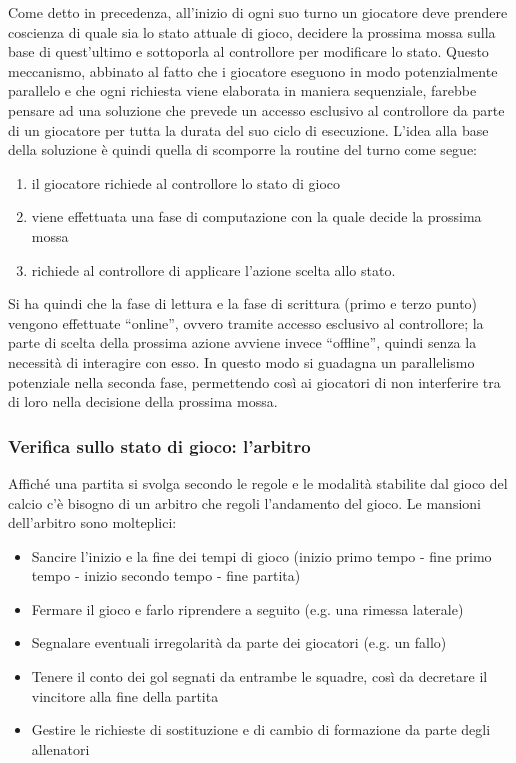 Come detto in precedenza, all'inizio di ogni suo turno un giocatore deve prendere coscienza di quale sia lo stato attuale di gioco, decidere la prossima mossa sulla base di quest'ultimo e sottoporla al controllore per modificare lo stato. Questo meccanismo, abbinato al fatto che i giocatore eseguono in modo potenzialmente parallelo e che ogni richiesta viene elaborata in maniera sequenziale, farebbe pensare ad una soluzione che prevede un accesso esclusivo al controllore da parte di un giocatore per tutta la durata del suo ciclo di esecuzione. L'idea alla base della soluzione è quindi quella di scomporre la routine del turno come segue:\\

\begin{enumerate}
	\item il giocatore richiede al controllore lo stato di gioco
	\item viene effettuata una fase di computazione con la quale decide la prossima mossa
	\item richiede al controllore di applicare l'azione scelta allo stato.
\end{enumerate}

Si ha quindi che la fase di lettura e la fase di scrittura (primo e terzo punto) vengono effettuate “online”, ovvero tramite accesso esclusivo al controllore; la parte di scelta della prossima azione avviene invece “offline”, quindi senza la necessità di interagire con esso. In questo modo si guadagna un parallelismo potenziale nella seconda fase, permettendo così ai giocatori di non interferire tra di loro nella decisione della prossima mossa.

\subsubsection{Verifica sullo stato di gioco: l'arbitro}
\label{sec:modello_verifica_arbitro}

Affiché una partita si svolga secondo le regole e le modalità stabilite dal gioco del calcio c'è bisogno di un arbitro che regoli l'andamento del gioco. Le mansioni dell'arbitro sono molteplici:

\begin{itemize}
	\item Sancire l'inizio e la fine dei tempi di gioco (inizio primo tempo - fine primo tempo - inizio secondo tempo - fine partita)
	\item Fermare il gioco e farlo riprendere a seguito (e.g. una rimessa laterale)
	\item Segnalare eventuali irregolarità da parte dei giocatori (e.g. un fallo)
	\item Tenere il conto dei gol segnati da entrambe le squadre, così da decretare il vincitore alla fine della partita
	\item Gestire le richieste di sostituzione e di cambio di formazione da parte degli allenatori
\end{itemize}

